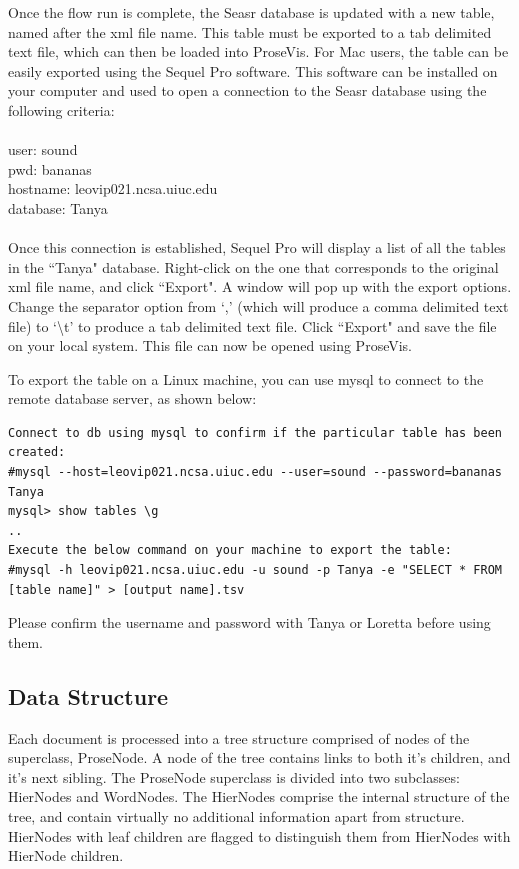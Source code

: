 \documentclass[fleqn]{article}
\begin{document}
Once the flow run is complete, the Seasr database is updated with a new table, named after the xml file name.  This table must be exported to a tab delimited text file, which can then be loaded into ProseVis.  For Mac users, the table can be easily exported using the Sequel Pro software.  This software can be installed on your computer and used to open a connection to the Seasr database using the following criteria:\\
\\
user: sound\\
pwd:  bananas\\
hostname: leovip021.ncsa.uiuc.edu\\
database: Tanya\\
\\
Once this connection is established, Sequel Pro will display a list of all the tables in the ``Tanya" database.  Right-click on the one that corresponds to the original xml file name, and click ``Export".  A window will pop up with the export options.  Change the separator option from `,' (which will produce a comma delimited text file) to `\textbackslash t' to produce a tab delimited text file.  Click ``Export" and save the file on your local system.  This file can now be opened using ProseVis.

To export the table on a Linux machine, you can use mysql to connect to the remote database server, as shown below:

\begin{verbatim}
Connect to db using mysql to confirm if the particular table has been created:
#mysql --host=leovip021.ncsa.uiuc.edu --user=sound --password=bananas Tanya
mysql> show tables \g
..
Execute the below command on your machine to export the table:
#mysql -h leovip021.ncsa.uiuc.edu -u sound -p Tanya -e "SELECT * FROM [table name]" > [output name].tsv
\end{verbatim}

Please confirm the username and password with Tanya or Loretta before using them.

\subsection{Data Structure}
Each document is processed into a tree structure comprised of nodes of the superclass, ProseNode.  A node of the tree contains links to both it's children, and it's next sibling.  The ProseNode superclass is divided into two subclasses: HierNodes and WordNodes.  The HierNodes comprise the internal structure of the tree, and contain virtually no additional information apart from structure.  HierNodes with leaf children are flagged to distinguish them from HierNodes with HierNode children.
\end{document}
